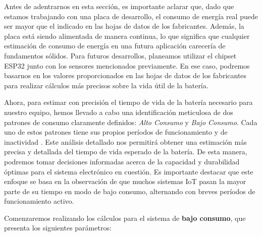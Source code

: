 
Antes de adentrarnos en esta sección, es importante aclarar que, dado que estamos trabajando con una placa de desarrollo, el consumo de energía real puede ser mayor que el indicado en las hojas de datos de los fabricantes. Además, la placa está siendo alimentada de manera continua, lo que significa que cualquier estimación de consumo de energía en una futura aplicación carecería de fundamentos sólidos. Para futuros desarrollos, planeamos utilizar el chipset ESP32 junto con los sensores mencionados previamente. En ese caso, podremos basarnos en los valores proporcionados en las hojas de datos de los fabricantes para realizar cálculos más precisos sobre la vida útil de la batería.

Ahora, para estimar con precisión el tiempo de vida de la batería necesario para nuestro equipo, hemos llevado a cabo una identificación meticulosa de dos patrones de consumo claramente definidos: \textit{Alto Consumo} y \textit{Bajo Consumo}. Cada uno de estos patrones tiene sus propios períodos de funcionamiento  y de inactividad . Este análisis detallado nos permitirá obtener una estimación más precisa y detallada del tiempo de vida esperado de la batería. De esta manera, podremos tomar decisiones informadas acerca de la capacidad y durabilidad óptimas para el sistema electrónico en cuestión. Es importante destacar que este enfoque se basa en la observación de que muchos sistemas IoT pasan la mayor parte de su tiempo en modo de bajo consumo, alternando con breves períodos de funcionamiento activo.

Comenzaremos realizando los cálculos para el sistema de \textbf{bajo consumo}, que presenta los siguientes parámetros:

